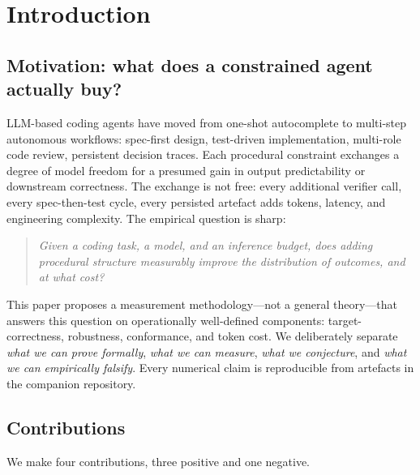 \section{Introduction}
\label{sec:introduction}

\subsection{Motivation: what does a constrained agent actually buy?}

LLM-based coding agents have moved from one-shot autocomplete to multi-step autonomous workflows: spec-first design, test-driven implementation, multi-role code review, persistent decision traces. Each procedural constraint exchanges a degree of model freedom for a presumed gain in output predictability or downstream correctness. The exchange is not free: every additional verifier call, every spec-then-test cycle, every persisted artefact adds tokens, latency, and engineering complexity. The empirical question is sharp:
\begin{quote}
\emph{Given a coding task, a model, and an inference budget, does adding procedural structure measurably improve the distribution of outcomes, and at what cost?}
\end{quote}

This paper proposes a measurement methodology---not a general theory---that answers this question on operationally well-defined components: target-correctness, robustness, conformance, and token cost. We deliberately separate \emph{what we can prove formally}, \emph{what we can measure}, \emph{what we conjecture}, and \emph{what we can empirically falsify}. Every numerical claim is reproducible from artefacts in the companion repository.

\subsection{Contributions}

We make four contributions, three positive and one negative.

